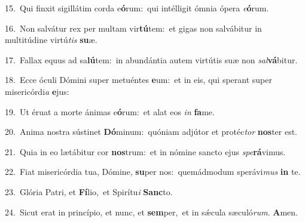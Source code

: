 {\numbfont\textcolor{\numbcolor}{15.}}~Qui finxit sigillátim corda e\-\textbf{ó}\-rum:~\star qui intélligit ómnia ópera \textit{e}\-\textbf{ó}rum.\par
{\numbfont\textcolor{\numbcolor}{16.}}~Non salvátur rex per multam vir\-\textbf{tú}\-tem:~\star et gigas non salvábitur in multitúdine virtú\textit{tis} \textbf{su}\-æ.\par
{\numbfont\textcolor{\numbcolor}{17.}}~Fallax equus ad sa\-\textbf{lú}\-tem:~\star in abundántia autem virtútis suæ non \textit{sal}\-\textbf{vá}bitur.\par
{\numbfont\textcolor{\numbcolor}{18.}}~Ecce óculi Dómini super metuéntes \textbf{e}\-um:~\star et in eis, qui sperant super misericórdi\textit{a} \textbf{e}\-jus:\par
{\numbfont\textcolor{\numbcolor}{19.}}~Ut éruat a morte ánimas e\-\textbf{ó}\-rum:~\star et alat eos \textit{in} \textbf{fa}\-me.\par
{\numbfont\textcolor{\numbcolor}{20.}}~Anima nostra sústinet \textbf{Dó}\-minum:~\star quóniam adjútor et protéc\textit{tor} \textbf{nos}\-ter est.\par
{\numbfont\textcolor{\numbcolor}{21.}}~Quia in eo lætábitur cor \textbf{nos}\-trum:~\star et in nómine sancto ejus \textit{spe}\-\textbf{rá}vimus.\par
{\numbfont\textcolor{\numbcolor}{22.}}~Fiat misericórdia tua, Dómine, \textbf{su}\-per nos:~\star quemádmodum sperávi\textit{mus} \textbf{in} te.\par
{\numbfont\textcolor{\numbcolor}{23.}}~Glória Patri, et \textbf{Fí}\-lio,~\star et Spirítu\textit{i} \textbf{Sanc}\-to.\par
{\numbfont\textcolor{\numbcolor}{24.}}~Sicut erat in princípio, et nunc, et \textbf{sem}\-per,~\star et in sǽcula sæculó\-\textit{rum}\-. \textbf{A}\-men.\par
